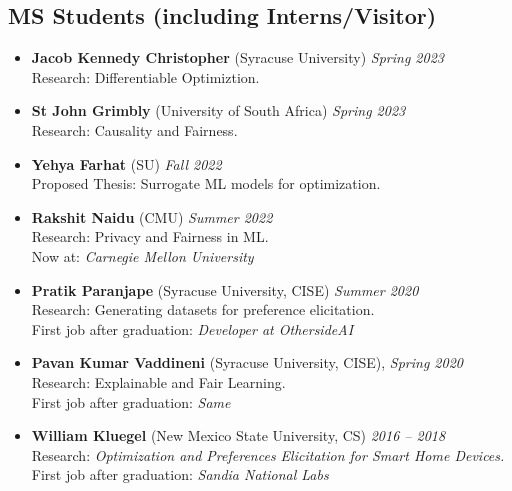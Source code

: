\subsection*{MS Students (including Interns/Visitor)}
\begin{itemize}
  \item \textbf{Jacob Kennedy Christopher} ({\sc Syracuse University}) \hfill{\em Spring 2023}\\
  {\sc Research:} Differentiable Optimiztion.

  \item \textbf{St John Grimbly} ({\sc University of South Africa}) \hfill{\em Spring 2023}\\
  {\sc Research:} Causality and Fairness.

  \item \textbf{Yehya Farhat} ({\sc SU}) \hfill{\em Fall 2022}\\
  {\sc Proposed Thesis:} Surrogate ML models for optimization.

  \item \textbf{Rakshit Naidu} ({\sc CMU}) \hfill{\em Summer 2022}\\
  {\sc Research:} Privacy and Fairness in ML.\\
  Now at: \textit{Carnegie Mellon University}



  \item \textbf{Pratik Paranjape} ({\sc Syracuse University}, CISE) 
  \hfill{\em Summer 2020}\\
  {\sc Research}: Generating datasets for preference elicitation.\\
  First job after graduation: \textit{Developer at OthersideAI}

  \item \textbf{Pavan Kumar Vaddineni}  ({\sc Syracuse University}, CISE), \hfill{\em Spring 2020}\\
  {\sc Research}: Explainable and Fair Learning.\\
  First job after graduation: \textit{Same}

  \item \textbf{William Kluegel} (New Mexico State University, CS) \hfill{\em 2016 -- 2018} \\
  {\sc Research}: \textit{Optimization and Preferences Elicitation for Smart Home Devices.}\\
  First job after graduation: \textit{Sandia National Labs}
\end{itemize}
\medskip

